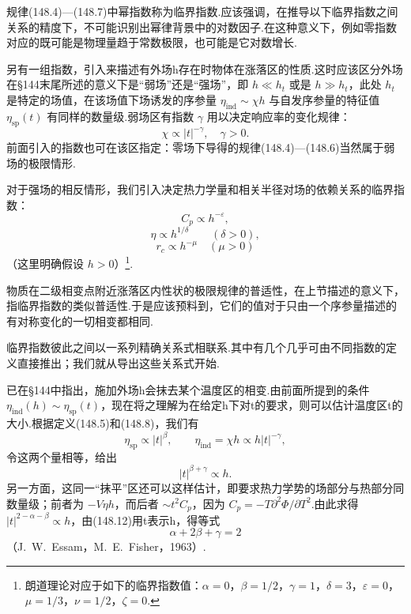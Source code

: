 规律(148.4)—(148.7)中幂指数称为临界指数.应该强调，在推导以下临界指数之间关系的精度下，不可能识别出幂律背景中的对数因子.在这种意义下，例如零指数对应的既可能是物理量趋于常数极限，也可能是它对数增长.

另有一组指数，引入来描述有外场h存在时物体在涨落区的性质.这时应该区分外场在§144末尾所述的意义下是“弱场”还是“强场”，即 $h\ll h_t$ 或是 $h\gg h_t$，此处 $h_t$ 是特定的场值，在该场值下场诱发的序参量 $\eta_{\mathrm{ind}}\sim\chi h$ 与自发序参量的特征值 $\eta_{\mathrm{sp}}(t)$ 有同样的数量级.弱场区有指数 $\gamma$ 用以决定响应率的变化规律：
\begin{equation}
  \chi\propto|t|^{-\gamma},\quad\gamma>0.
\end{equation}
前面引入的指数也可在该区指定：零场下导得的规律(148.4)—(148.6)当然属于弱场的极限情形.

对于强场的相反情形，我们引入决定热力学量和相关半径对场的依赖关系的临界指数：
\begin{equation}
  C_p\propto h^{-\varepsilon},
\end{equation}
\begin{equation}
  \eta\propto h^{1/\delta}\qquad(\delta>0),
\end{equation}
\begin{equation}
  r_c\propto h^{-\mu}\quad(\mu>0)
\end{equation}
（这里明确假设 $h>0$）\footnote{朗道理论对应于如下的临界指数值：$\alpha=0$，$\beta=1/2$，$\gamma=1$，$\delta=3$，$\varepsilon=0$，$\mu=1/3$，$\nu=1/2$，$\zeta=0$.}.

物质在二级相变点附近涨落区内性状的极限规律的普适性，在上节描述的意义下，指临界指数的类似普适性.于是应该预料到，它们的值对于只由一个序参量描述的有对称变化的一切相变都相同.

临界指数彼此之间以一系列精确关系式相联系.其中有几个几乎可由不同指数的定义直接推出；我们就从导出这些关系式开始.

已在§144中指出，施加外场h会抹去某个温度区的相变.由前面所提到的条件 $\eta_{\mathrm{ind}}(h)\sim\eta_{\mathrm{sp}}(t)$，现在将之理解为在给定h下对t的要求，则可以估计温度区t的大小.根据定义(148.5)和(148.8)，我们有
\begin{equation*}
  \eta_{\mathrm{sp}}\propto|t|^{\beta},\qquad
  \eta_{\mathrm{ind}}=\chi h\propto h|t|^{-\gamma},
\end{equation*}
令这两个量相等，给出
\begin{equation}
  |t|^{\beta+\gamma}\propto h.
\end{equation}
另一方面，这同一“抹平”区还可以这样估计，即要求热力学势的场部分与热部分同数量级；前者为 $-V\eta h$，而后者 $\sim t^2C_p$，因为 $C_p=-T\partial^2\Phi/\partial T^2$.由此求得 $|t|^{2-\alpha-\beta}\propto h$，由(148.12)用t表示h，得等式
\begin{equation}
  \alpha+2\beta+\gamma=2
\end{equation}
（J.~W.~Essam，M.~E.~Fisher，1963）.

